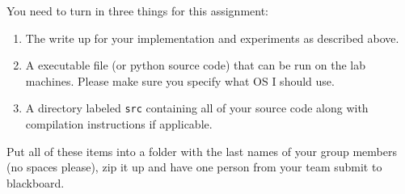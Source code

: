 \documentclass[letterpaper]{article}
\begin{document}
You need to turn in three things for this assignment:

%
\begin{enumerate}
\item The write up for your implementation and experiments as
  described above.

\item A executable file (or python source code) that can be run on the
  lab machines.  Please make sure you specify what OS I should use.

\item A directory labeled {\tt src} containing all of your source code
  along with compilation instructions if applicable.

\end{enumerate}

Put all of these items into a folder with the last names of your
group members (no spaces please), zip it up and have one person from your
team submit to blackboard.
\end{document}
